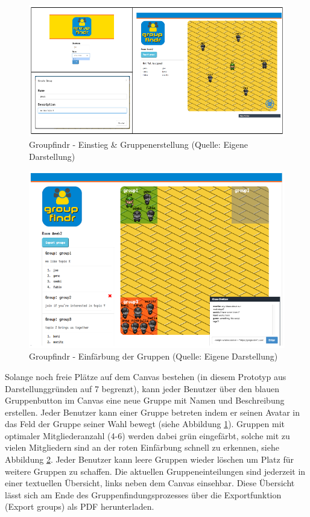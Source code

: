\begin{figure}[h]
\centering
\includegraphics{graphiken/groupfindr_einstieg-gruppenerstellung.png}%
\caption{Groupfindr - Einstieg \& Gruppenerstellung (Quelle: Eigene Darstellung)}%
\label{groupfindr_einstieg-gruppenerstellung}%
\end{figure}


\begin{figure}[h]
\centering
\includegraphics{graphiken/groupfindr_einfaerbung-chat.png}%
\caption{Groupfindr - Einfärbung der Gruppen (Quelle: Eigene Darstellung)}%
\label{groupfindr_einfaerbung-chat}%
\end{figure}

Solange noch freie Plätze auf dem Canvas bestehen (in diesem Prototyp aus Darstellunggründen auf 7 begrenzt), kann jeder Benutzer über den blauen Gruppenbutton im Canvas eine neue Gruppe mit Namen und Beschreibung erstellen. Jeder Benutzer kann einer Gruppe betreten indem er seinen Avatar in das Feld der Gruppe seiner Wahl bewegt (siehe Abbildung \ref{groupfindr_einstieg-gruppenerstellung}). Gruppen mit optimaler Mitgliederanzahl (4-6) werden dabei grün eingefärbt, solche mit zu vielen Mitgliedern sind an der roten Einfärbung schnell zu erkennen, siehe Abbildung \ref{groupfindr_einfaerbung-chat}. Jeder Benutzer kann leere Gruppen wieder löschen um Platz für weitere Gruppen zu schaffen. Die aktuellen Gruppeneinteilungen sind jederzeit in einer textuellen Übersicht, links neben dem Canvas einsehbar. Diese Übersicht lässt sich am Ende des Gruppenfindungsprozesses über die Exportfunktion (Export groups) als PDF herunterladen.